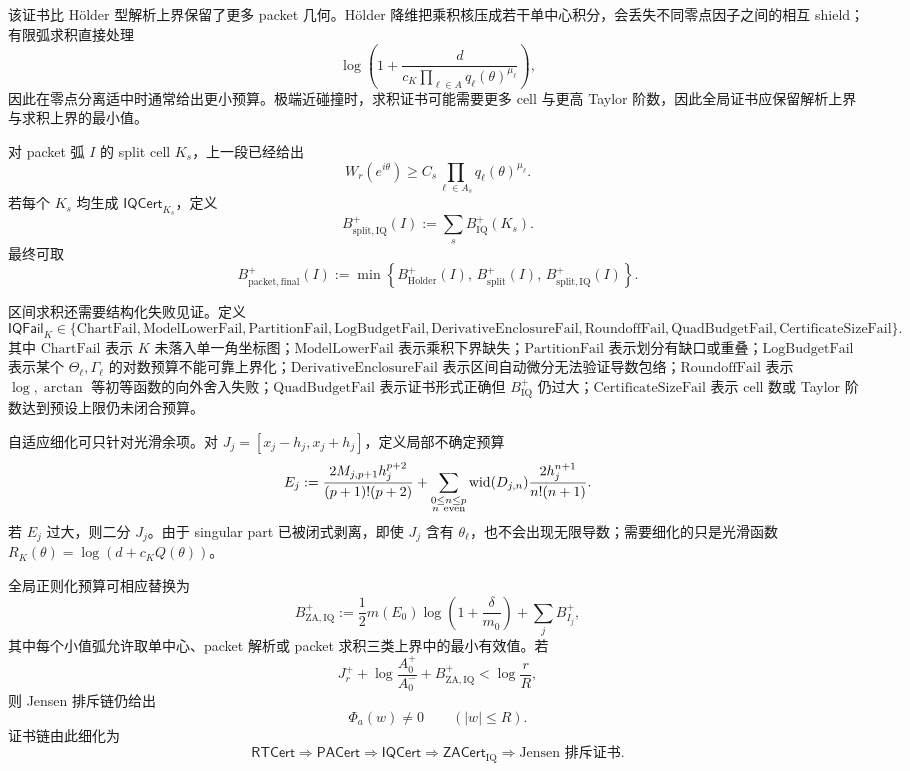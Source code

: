 该证书比 Hölder 型解析上界保留了更多 packet 几何。Hölder 降维把乘积核压成若干单中心积分，会丢失不同零点因子之间的相互 shield；有限弧求积直接处理
\[
\log\left(
1+\frac{d}{c_K\prod_{\ell\in A}q_\ell(\theta)^{\mu_\ell}}
\right),
\]
因此在零点分离适中时通常给出更小预算。极端近碰撞时，求积证书可能需要更多 cell 与更高 Taylor 阶数，因此全局证书应保留解析上界与求积上界的最小值。

对 packet 弧 \(I\) 的 split cell \(K_s\)，上一段已经给出
\[
W_r(e^{i\theta})
\ge
C_s\prod_{\ell\in A_s}q_\ell(\theta)^{\mu_\ell}.
\]
若每个 \(K_s\) 均生成 \(\mathsf{IQCert}_{K_s}\)，定义
\[
B_{\mathrm{split,IQ}}^+(I)
:=
\sum_sB_{\mathrm{IQ}}^+(K_s).
\]
最终可取
\[
B_{\mathrm{packet,final}}^+(I)
:=
\min\left\{
B_{\mathrm{Holder}}^+(I),\,
B_{\mathrm{split}}^+(I),\,
B_{\mathrm{split,IQ}}^+(I)
\right\}.
\]

区间求积还需要结构化失败见证。定义
\[
\mathsf{IQFail}_K
\in
\{
\mathrm{ChartFail},
\mathrm{ModelLowerFail},
\mathrm{PartitionFail},
\mathrm{LogBudgetFail},
\mathrm{DerivativeEnclosureFail},
\mathrm{RoundoffFail},
\mathrm{QuadBudgetFail},
\mathrm{CertificateSizeFail}
\}.
\]
其中 \(\mathrm{ChartFail}\) 表示 \(K\) 未落入单一角坐标图；\(\mathrm{ModelLowerFail}\) 表示乘积下界缺失；\(\mathrm{PartitionFail}\) 表示划分有缺口或重叠；\(\mathrm{LogBudgetFail}\) 表示某个 \(\Theta_\ell,\Gamma_\ell\) 的对数预算不能可靠上界化；\(\mathrm{DerivativeEnclosureFail}\) 表示区间自动微分无法验证导数包络；\(\mathrm{RoundoffFail}\) 表示 \(\log,\arctan\) 等初等函数的向外舍入失败；\(\mathrm{QuadBudgetFail}\) 表示证书形式正确但 \(B_{\mathrm{IQ}}^+\) 仍过大；\(\mathrm{CertificateSizeFail}\) 表示 cell 数或 Taylor 阶数达到预设上限仍未闭合预算。

自适应细化可只针对光滑余项。对 \(J_j=[x_j-h_j,x_j+h_j]\)，定义局部不确定预算
\[
E_j
:=
\frac{2M_{j,p+1}h_j^{p+2}}{(p+1)!(p+2)}
+
\sum_{\substack{0\le n\le p\\ n\ {\rm even}}}
\operatorname{wid}(D_{j,n})
\frac{2h_j^{n+1}}{n!(n+1)}.
\]
若 \(E_j\) 过大，则二分 \(J_j\)。由于 singular part 已被闭式剥离，即使 \(J_j\) 含有 \(\theta_\ell\)，也不会出现无限导数；需要细化的只是光滑函数 \(R_K(\theta)=\log(d+c_KQ(\theta))\)。

全局正则化预算可相应替换为
\[
B_{\mathrm{ZA,IQ}}^+
:=
\frac12m(E_0)\log\left(1+\frac{\delta}{m_0}\right)
+
\sum_jB_{I_j}^+,
\]
其中每个小值弧允许取单中心、packet 解析或 packet 求积三类上界中的最小有效值。若
\[
J_r^+
+
\log\frac{A_0^+}{A_0^-}
+
B_{\mathrm{ZA,IQ}}^+
<
\log\frac rR,
\]
则 Jensen 排斥链仍给出
\[
\Phi_a(w)\ne0
\qquad(|w|\le R).
\]
证书链由此细化为
\[
\mathsf{RTCert}
\Longrightarrow
\mathsf{PACert}
\Longrightarrow
\mathsf{IQCert}
\Longrightarrow
\mathsf{ZACert}_{\mathrm{IQ}}
\Longrightarrow
\text{Jensen 排斥证书}.
\]
